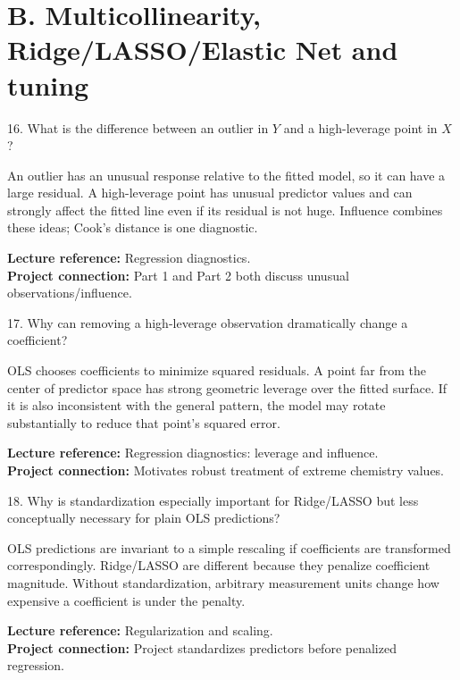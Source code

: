 \documentclass[10.5pt,a4paper]{article}
\newcommand{\chapref}[1]{\textbf{Lecture reference:} #1}
\newcommand{\projectref}[1]{\textbf{Project connection:} #1}
\begin{document}
\section*{B. Multicollinearity, Ridge/LASSO/Elastic Net and tuning}
\begin{qbox}{16. What is the difference between an outlier in $Y$ and a high-leverage point in $X$?}
\end{qbox}
\begin{answerbox}An outlier has an unusual response relative to the fitted model, so it can have a large residual. A high-leverage point has unusual predictor values and can strongly affect the fitted line even if its residual is not huge. Influence combines these ideas; Cook's distance is one diagnostic.\end{answerbox}
\begin{refbox}\chapref{Regression diagnostics.}\\\projectref{Part 1 and Part 2 both discuss unusual observations/influence.}\end{refbox}
\begin{qbox}{17. Why can removing a high-leverage observation dramatically change a coefficient?}
\end{qbox}
\begin{answerbox}OLS chooses coefficients to minimize squared residuals. A point far from the center of predictor space has strong geometric leverage over the fitted surface. If it is also inconsistent with the general pattern, the model may rotate substantially to reduce that point's squared error.\end{answerbox}
\begin{refbox}\chapref{Regression diagnostics: leverage and influence.}\\\projectref{Motivates robust treatment of extreme chemistry values.}\end{refbox}
\begin{qbox}{18. Why is standardization especially important for Ridge/LASSO but less conceptually necessary for plain OLS predictions?}
\end{qbox}
\begin{answerbox}OLS predictions are invariant to a simple rescaling if coefficients are transformed correspondingly. Ridge/LASSO are different because they penalize coefficient magnitude. Without standardization, arbitrary measurement units change how expensive a coefficient is under the penalty.\end{answerbox}
\begin{refbox}\chapref{Regularization and scaling.}\\\projectref{Project standardizes predictors before penalized regression.}\end{refbox}
\end{document}
